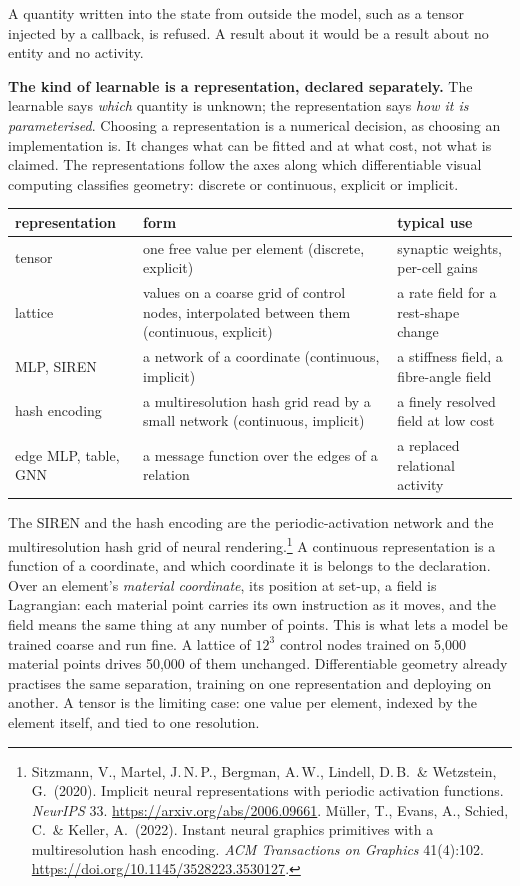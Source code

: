 \documentclass[11pt]{article}
\begin{document}
A quantity written into the state from outside the model, such as a tensor injected by a
callback, is refused. A result about it would be a result about no entity and no activity.

\textbf{The kind of learnable is a representation, declared separately.} The learnable
says \emph{which} quantity is unknown; the representation says \emph{how it is
parameterised}. Choosing a representation is a numerical decision, as choosing an
implementation is. It changes what can be fitted and at what cost, not what is claimed.
The representations follow the axes along which differentiable visual computing
classifies geometry: discrete or continuous, explicit or implicit.

\begin{center}
\small
\begin{tabular}{P{2.6cm}P{6.6cm}P{4.6cm}}
\toprule
representation & form & typical use \\
\midrule
tensor & one free value per element (discrete, explicit) & synaptic weights, per-cell
gains \\
lattice & values on a coarse grid of control nodes, interpolated between them (continuous,
explicit) & a rate field for a rest-shape change \\
MLP, SIREN & a network of a coordinate (continuous, implicit) & a stiffness field, a
fibre-angle field \\
hash encoding & a multiresolution hash grid read by a small network (continuous,
implicit) & a finely resolved field at low cost \\
edge MLP, table, GNN & a message function over the edges of a relation & a replaced
relational activity \\
\bottomrule
\end{tabular}
\end{center}

The SIREN and the hash encoding are the periodic-activation network and the
multiresolution hash grid of neural rendering.\footnote{Sitzmann, V., Martel, J.\,N.\,P.,
Bergman, A.\,W., Lindell, D.\,B.\ \& Wetzstein, G.\ (2020). Implicit neural
representations with periodic activation functions. \emph{NeurIPS} 33.
\url{https://arxiv.org/abs/2006.09661}. M\"uller, T., Evans, A., Schied, C.\ \& Keller, A.\
(2022). Instant neural graphics primitives with a multiresolution hash encoding. \emph{ACM
Transactions on Graphics} 41(4):102. \url{https://doi.org/10.1145/3528223.3530127}.} A
continuous representation is a function of a coordinate, and which coordinate it is
belongs to the declaration. Over an element's \emph{material coordinate}, its position at
set-up, a field is Lagrangian: each material point carries its own instruction as it
moves, and the field means the same thing at any number of points. This is what lets a
model be trained coarse and run fine. A lattice of $12^3$ control nodes trained on 5{,}000
material points drives 50{,}000 of them unchanged. Differentiable geometry already
practises the same separation, training on one representation and deploying on another.
A tensor is the limiting case: one value per element, indexed by the element itself, and
tied to one resolution.
\end{document}
